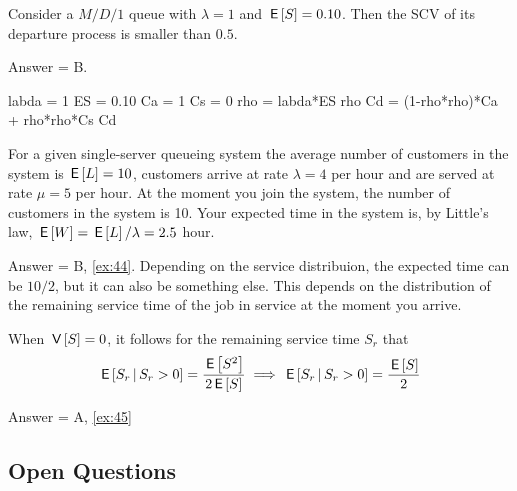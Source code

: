 \begin{exercise}[201904, 1]
  Consider a $M/D/1$ queue with $\lambda=1$ and $\,\mathsf{E}\left[S\right] = 0.10$. Then the SCV of its departure process is smaller than $0.5$.
\begin{solution}
    Answer = B.
    \begin{pyconsole}
labda = 1
ES = 0.10
Ca = 1
Cs = 0
rho = labda*ES
rho
Cd = (1-rho*rho)*Ca + rho*rho*Cs
Cd
      
    \end{pyconsole}
\end{solution}
\end{exercise}

\begin{exercise}[201904, 1] For a given single-server queueing system the average number of customers in the system is $\,\mathsf{E}\left[L\right] = 10$, customers arrive at rate $\lambda=4$ per hour and are served at rate $\mu=5$ per hour.
  At the moment you join the system, the number of customers in the system is 10.
  Your expected time in the system is, by Little's law, $\,\mathsf{E}\left[W\right] = \,\mathsf{E}\left[L\right] /\lambda = 2.5$ hour.
\begin{solution} Answer = B, \ref{ex:44}.
    Depending on the service distribuion, the expected time can be $10/2$, but it can also be something else.
    This depends on the distribution of the remaining service time of the job in service at the moment you arrive.
\end{solution}
\end{exercise}

\begin{exercise}[201904, 1]
  When $\,\mathsf{V}\left[S\right] = 0$, it follows for the remaining service time $S_r$ that
\begin{equation*}
\,\mathsf{E}\left[S_r\,\middle|\, S_r>0\right] = \frac{\,\mathsf{E}\left[S^2\right]}{2 \,\mathsf{E}\left[S\right]} \implies \,\mathsf{E}\left[S_r\,\middle|\, S_r>0\right] = \frac{\,\mathsf{E}\left[S\right]}2
\end{equation*}
\begin{solution} Answer = A, \ref{ex:45}
\end{solution}
\end{exercise}



\subsection{Open Questions}


